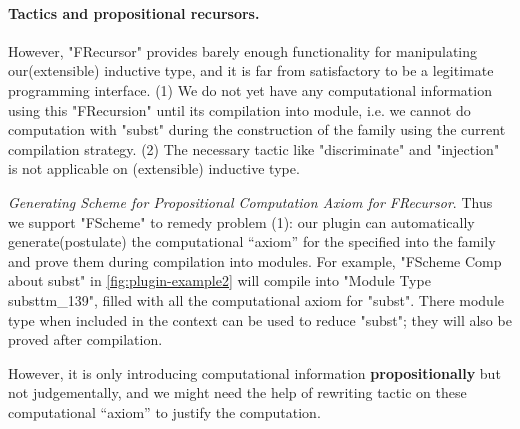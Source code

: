 \paragraph{Tactics and propositional recursors.}

However, "FRecursor" provides barely enough functionality for
manipulating our(extensible) inductive type, and it is far from
satisfactory to be a legitimate programming interface. (1) We do not yet
have any computational information using this "FRecursion" until its
compilation into module, i.e. we cannot do computation with "subst" during
the construction of the family using the current compilation strategy.
(2) The necessary tactic like "discriminate" and "injection" is not
applicable on (extensible) inductive type.



\textit{Generating Scheme for Propositional Computation Axiom for FRecursor}. Thus we support "FScheme" to remedy problem (1): our plugin can automatically generate(postulate) the computational ``axiom'' for the specified  into the family and prove them during compilation into modules. For example, "FScheme Comp about subst" in \cref{fig:plugin-example2} will compile into "Module Type substtm_139", filled with all the computational axiom for "subst". There module type when included in the context can be used to reduce "subst"; they will also be proved after compilation.

However, it is only introducing computational information \textbf{propositionally} but not judgementally, and we might need the help of rewriting tactic on these computational ``axiom'' to justify the computation. 




